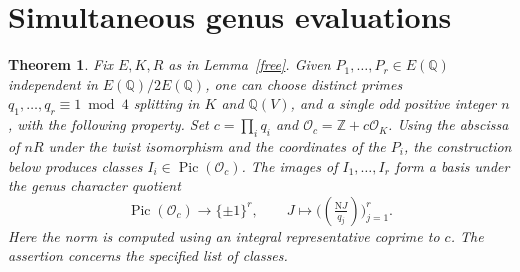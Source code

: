 \documentclass[11pt]{article}
\newtheorem{thm}{Theorem}\newtheorem{lem}[thm]{Lemma}\newtheorem{prop}[thm]{Proposition}
\newcommand{\Q}{\mathbb Q}\newcommand{\Z}{\mathbb Z}\newcommand{\F}{\mathbb F}
\DeclareMathOperator{\Pic}{Pic}\DeclareMathOperator{\Gal}{Gal}
\begin{document}
\section{Simultaneous genus evaluations}

\begin{thm}\label{main}
Fix $E,K,R$ as in Lemma~\ref{free}. Given $P_1,\ldots,P_r\in E(\Q)$
independent in $E(\Q)/2E(\Q)$, one can choose distinct primes
$q_1,\ldots,q_r\equiv1\bmod4$ splitting in $K$ and $\Q(V)$,
and a single odd positive integer $n$, with the following property.
Set $c=\prod_i q_i$ and $\mathcal O_c=\Z+c\mathcal O_K$.
Using the abscissa of $nR$ under the twist isomorphism and the
coordinates of the $P_i$, the construction below produces classes
$I_i\in\Pic(\mathcal O_c)$. The images of $I_1,\ldots,I_r$
form a basis under the genus character quotient
\[
 \Pic(\mathcal O_c)\longrightarrow\{\pm1\}^r,\qquad
 J\longmapsto\bigl((\tfrac{\mathrm N J}{q_j})\bigr)_{j=1}^r .
\]
Here the norm is computed using an integral representative coprime
to $c$. The assertion concerns the specified list of classes.
\end{thm}
\end{document}
